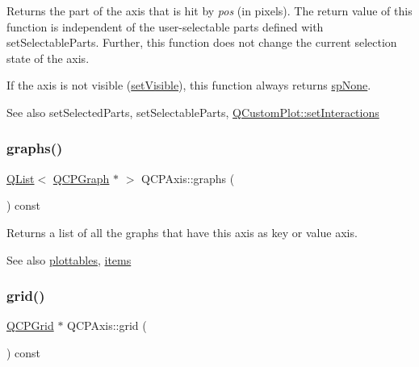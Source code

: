 Returns the part of the axis that is hit by {\itshape pos} (in pixels). The return value of this function is independent of the user-\/selectable parts defined with set\+Selectable\+Parts. Further, this function does not change the current selection state of the axis.

If the axis is not visible (\hyperlink{class_q_c_p_layerable_a3bed99ddc396b48ce3ebfdc0418744f8}{set\+Visible}), this function always returns \hyperlink{class_q_c_p_axis_abee4c7a54c468b1385dfce2c898b115fac80ec43d6c97386e7c4b728e61fa2385}{sp\+None}.

\begin{DoxySeeAlso}{See also}
set\+Selected\+Parts, set\+Selectable\+Parts, \hyperlink{class_q_custom_plot_a5ee1e2f6ae27419deca53e75907c27e5}{Q\+Custom\+Plot\+::set\+Interactions} 
\end{DoxySeeAlso}
\mbox{\label{class_q_c_p_axis_ad590c0da223697a2727f97a520870fec}} 
\subsubsection{\texorpdfstring{graphs()}{graphs()}}
{\footnotesize\ttfamily \hyperlink{class_q_list}{Q\+List}$<$ \hyperlink{class_q_c_p_graph}{Q\+C\+P\+Graph} $\ast$ $>$ Q\+C\+P\+Axis\+::graphs (\begin{DoxyParamCaption}{ }\end{DoxyParamCaption}) const}

Returns a list of all the graphs that have this axis as key or value axis.

\begin{DoxySeeAlso}{See also}
\hyperlink{class_q_c_p_axis_ac5e0f6f65c75efb5fd32275d6e4ef0d6}{plottables}, \hyperlink{class_q_c_p_axis_a42761bc68e2f3a9f68549d45b73f705b}{items} 
\end{DoxySeeAlso}
\mbox{\label{class_q_c_p_axis_a63f1dd2df663680d2a8d06c19592dd63}} 
\subsubsection{\texorpdfstring{grid()}{grid()}}
{\footnotesize\ttfamily \hyperlink{class_q_c_p_grid}{Q\+C\+P\+Grid} $\ast$ Q\+C\+P\+Axis\+::grid (\begin{DoxyParamCaption}{ }\end{DoxyParamCaption}) const\hspace{0.3cm}{\ttfamily [inline]}}

